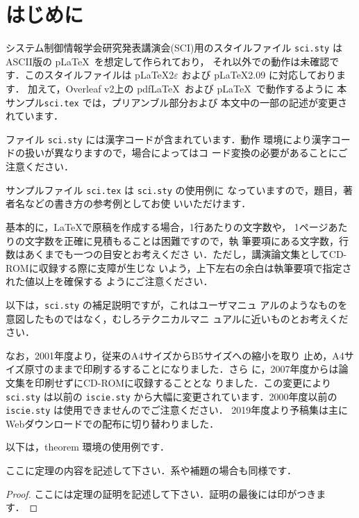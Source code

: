 \documentclass[a4paper]{article}
\begin{document}
\maketitle

\section{はじめに}

システム制御情報学会研究発表講演会(SCI)用のスタイルファイル 
\verb+sci.sty+ は ASCII版の p\LaTeX\ を想定して作られており，
それ以外での動作は未確認です．このスタイルファイルは 
p\LaTeX2$\varepsilon$ および p\LaTeX 2.09 に対応しております．
%
加えて，Overleaf v2上の pdf\LaTeX\ および p\LaTeX\ で動作するように
本サンプル\verb+sci.tex+ では，プリアンブル部分および
本文中の一部の記述が変更されています．

ファイル \verb+sci.sty+ には漢字コードが含まれています．動作
環境により漢字コードの扱いが異なりますので，場合によってはコ
ード変換の必要があることにご注意ください．

サンプルファイル \verb+sci.tex+ は \verb+sci.sty+ の使用例に
なっていますので，題目，著者名などの書き方の参考例としてお使
いいただけます．

基本的に，\LaTeX で原稿を作成する場合，1行あたりの文字数や，
1ページあたりの文字数を正確に見積もることは困難ですので，執
筆要項にある文字数，行数はあくまでも一つの目安とお考えくださ
い．ただし，講演論文集としてCD-ROMに収録する際に支障が生じな
いよう，上下左右の余白は執筆要項で指定された値以上を確保する
ようにご注意ください．

以下は，\verb+sci.sty+ の補足説明ですが，これはユーザマニュ
アルのようなものを意図したものではなく，むしろテクニカルマニ
ュアルに近いものとお考えください．

なお，2001年度より，従来のA4サイズからB5サイズへの縮小を取り
止め，A4サイズ原寸のままで印刷するすることになりました．さら
に，2007年度からは論文集を印刷せずにCD-ROMに収録することとな
りました．この変更により \verb+sci.sty+ は以前の
\verb+iscie.sty+ から大幅に変更されています．2000年度以前の 
\verb+iscie.sty+ は使用できませんのでご注意ください．
%
2019年度より予稿集は主にWebダウンロードでの配布に切り替わりました．

以下は，theorem 環境の使用例です．

\begin{theorem}
ここに定理の内容を記述して下さい．系や補題の場合も同様です．
\end{theorem}
\begin{proof}
ここには定理の証明を記述して下さい．証明の最後には印がつきま
す．
\end{proof}
\end{document}
